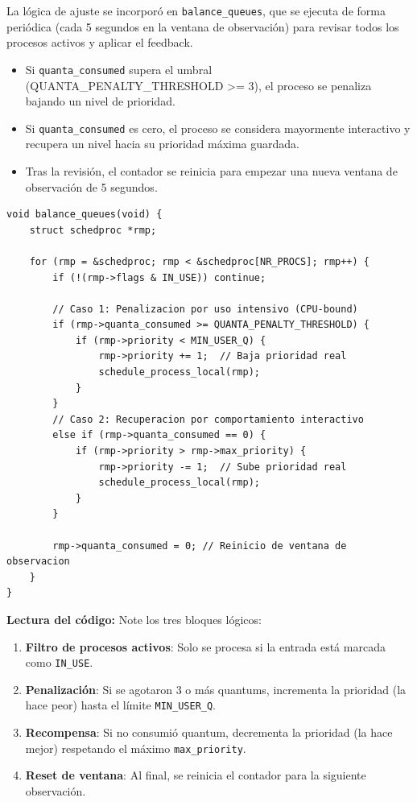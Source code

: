 \documentclass[12pt,spanish]{article}
\begin{document}
La lógica de ajuste se incorporó en \texttt{balance\_queues}, que se ejecuta de forma periódica (cada 5 segundos en la ventana de observación) para revisar todos los procesos activos y aplicar el feedback.

\begin{itemize}
    \item Si \texttt{quanta\_consumed} supera el umbral (QUANTA\_PENALTY\_THRESHOLD >= 3), el proceso se penaliza bajando un nivel de prioridad.
    \item Si \texttt{quanta\_consumed} es cero, el proceso se considera mayormente interactivo y recupera un nivel hacia su prioridad máxima guardada.
    \item Tras la revisión, el contador se reinicia para empezar una nueva ventana de observación de 5 segundos.
\end{itemize}

\begin{lstlisting}[caption=Logica de ajuste dinámico en la función balance\_queues]
void balance_queues(void) {
    struct schedproc *rmp;

    for (rmp = &schedproc; rmp < &schedproc[NR_PROCS]; rmp++) {
        if (!(rmp->flags & IN_USE)) continue;

        // Caso 1: Penalizacion por uso intensivo (CPU-bound)
        if (rmp->quanta_consumed >= QUANTA_PENALTY_THRESHOLD) {
            if (rmp->priority < MIN_USER_Q) {
                rmp->priority += 1;  // Baja prioridad real
                schedule_process_local(rmp);
            }
        }
        // Caso 2: Recuperacion por comportamiento interactivo
        else if (rmp->quanta_consumed == 0) {
            if (rmp->priority > rmp->max_priority) {
                rmp->priority -= 1;  // Sube prioridad real
                schedule_process_local(rmp);
            }
        }

        rmp->quanta_consumed = 0; // Reinicio de ventana de observacion
    }
}
\end{lstlisting}

\textbf{Lectura del código:} Note los tres bloques lógicos:
\begin{enumerate}
    \item \textbf{Filtro de procesos activos}: Solo se procesa si la entrada está marcada como \texttt{IN\_USE}.
    \item \textbf{Penalización}: Si se agotaron 3 o más quantums, incrementa la prioridad (la hace peor) hasta el límite \texttt{MIN\_USER\_Q}.
    \item \textbf{Recompensa}: Si no consumió quantum, decrementa la prioridad (la hace mejor) respetando el máximo \texttt{max\_priority}.
    \item \textbf{Reset de ventana}: Al final, se reinicia el contador para la siguiente observación.
\end{enumerate}
\end{document}
